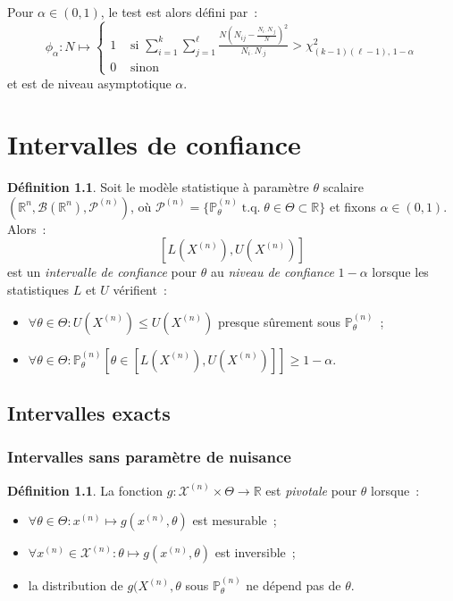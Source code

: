 \documentclass{report}
\DeclareMathOperator{\tq}{\text{ t.q. }}
\renewcommand{\P}{\mathbb P}
\newcommand{\statmod}[4]{\left(#1^{#4}, #2\left(#1^{#4}\right), #3^{\left(#4\right)}\right)}
\newcommand{\R}{\mathbb R}
\newcommand{\Brl}{\mathcal B}  %
\newcommand{\n}{{(n)}}
\newcommand{\Xn}{{X^\n}}
\theoremstyle{definition}
\newtheorem{déf}[thm]{Définition}
\theoremstyle{remark}
\begin{document}
			Pour $\alpha \in (0, 1)$, le test est alors défini par~:
			\[\phi_\alpha : N \mapsto
			\begin{cases}
				1 &\text{ si } \sum_{i=1}^k\sum_{j=1}^\ell \frac {N\left(N_{ij} - \frac {N_{i \cdot}N_{\cdot j}}N\right)^2}{N_{i \cdot}N_{\cdot j}}
					> \chi^2_{(k-1)(\ell-1),\,1-\alpha} \\
				0 &\text{ sinon}
			\end{cases}\]
			et est de niveau asymptotique $\alpha$.

\chapter{Intervalles de confiance}
	\begin{déf} Soit le modèle statistique à paramètre $\theta$ scalaire $\statmod \R\Brl{\mathcal P}n$, où $\mathcal P^\n =
	\{\P_\theta^\n \tq \theta \in \Theta \subset \R\}$ et fixons $\alpha \in (0, 1)$. Alors~:
	\[\left[L(\Xn), U(\Xn)\right]\]
	est un \textit{intervalle de confiance} pour $\theta$ au \textit{niveau de confiance} $1-\alpha$ lorsque les statistiques $L$ et $U$ vérifient~:
	\begin{itemize}
		\item $\forall \theta \in \Theta : U(\Xn) \leq U(\Xn)$ presque sûrement sous $\P_\theta^\n$~;
		\item $\forall \theta \in \Theta : \P_\theta^\n\left[\theta \in \left[L(\Xn), U(\Xn)\right]\right] \geq 1-\alpha$.
	\end{itemize}
	\end{déf}

	\section{Intervalles exacts}
		\subsection{Intervalles sans paramètre de nuisance}
			\begin{déf} La fonction $g : \mathcal X^\n \times \Theta \to \R$ est \textit{pivotale} pour $\theta$ lorsque~:
			\begin{itemize}
				\item $\forall \theta \in \Theta : x^\n \mapsto g(x^\n, \theta)$ est mesurable~;
				\item $\forall x^\n \in \mathcal X^\n : \theta \mapsto g(x^\n, \theta)$ est inversible~;
				\item la distribution de $g(\Xn, \theta$ sous $\P_\theta^\n$ ne dépend pas de $\theta$.
			\end{itemize}
			\end{déf}
\end{document}
